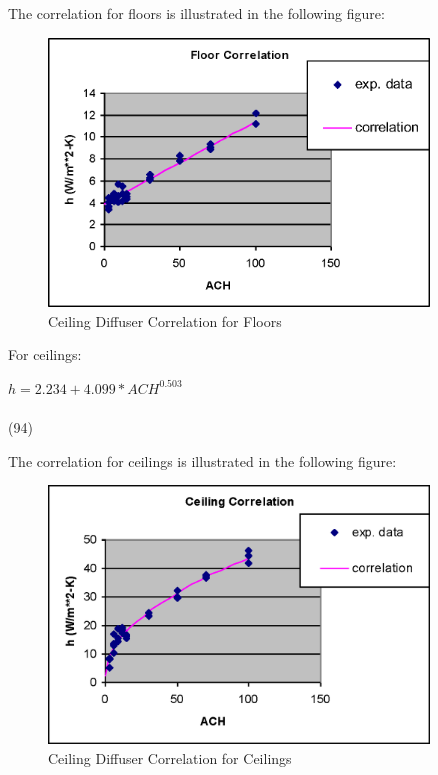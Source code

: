 The correlation for floors is illustrated in the following figure:

\begin{figure}[hbtp] %
\centering
\includegraphics[width=0.9\textwidth, height=0.9\textheight, keepaspectratio=true]{media/image378.png}
\caption{  Ceiling Diffuser Correlation for Floors \protect \label{fig:ceiling-diffuser-correlation-for-floors}}
\end{figure}

For ceilings:

\(h = 2.234 + 4.099 * AC{H^{0.503}}\) ~~~~~~~~~~~~~~~~~~~~~~~~~~~~~~~~~~~~~~~~~~~~~~~~~~~~~~~~~~~~~~~~~~~~ (94)

The correlation for ceilings is illustrated in the following figure:

\begin{figure}[hbtp] %
\centering
\includegraphics[width=0.9\textwidth, height=0.9\textheight, keepaspectratio=true]{media/image380.png}
\caption{  Ceiling Diffuser Correlation for Ceilings \protect \label{fig:ceiling-diffuser-correlation-for-ceilings}}
\end{figure}

